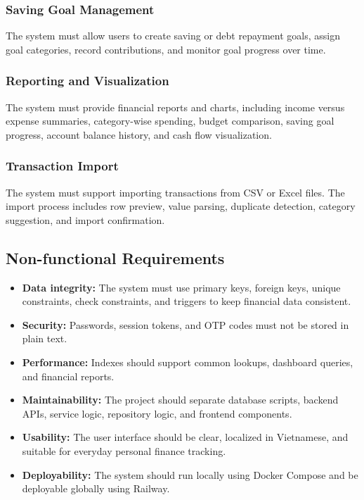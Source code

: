 ﻿\documentclass{article}
\begin{document}
\subsubsection{Saving Goal Management}
The system must allow users to create saving or debt repayment goals, assign goal categories, record contributions, and monitor goal progress over time.

\subsubsection{Reporting and Visualization}
The system must provide financial reports and charts, including income versus expense summaries, category-wise spending, budget comparison, saving goal progress, account balance history, and cash flow visualization.

\subsubsection{Transaction Import}
The system must support importing transactions from CSV or Excel files. The import process includes row preview, value parsing, duplicate detection, category suggestion, and import confirmation.

\subsection{Non-functional Requirements}

\begin{itemize}
    \item \textbf{Data integrity:} The system must use primary keys, foreign keys, unique constraints, check constraints, and triggers to keep financial data consistent.
    \item \textbf{Security:} Passwords, session tokens, and OTP codes must not be stored in plain text.
    \item \textbf{Performance:} Indexes should support common lookups, dashboard queries, and financial reports.
    \item \textbf{Maintainability:} The project should separate database scripts, backend APIs, service logic, repository logic, and frontend components.
    \item \textbf{Usability:} The user interface should be clear, localized in Vietnamese, and suitable for everyday personal finance tracking.
    \item \textbf{Deployability:} The system should run locally using Docker Compose and be deployable globally using Railway.
\end{itemize}
\end{document}
